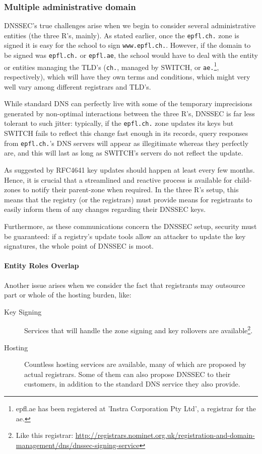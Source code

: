 \documentclass[a4paper,twocolumn]{scrartcl}
\begin{document}
\subsubsection{Multiple administrative domain}
DNSSEC's true challenges arise when we begin to consider several administrative entities (the three R's, mainly). As stated earlier, once the \verb|epfl.ch.| zone is signed it is easy for the school to sign \verb|www.epfl.ch.|. However, if the domain to be signed was \verb|epfl.ch.| or \verb|epfl.ae|, the school would have to deal with the entity or entities managing the TLD's (\verb|ch.|, managed by SWITCH, or \verb|ae.|\footnote{epfl.ae has been registered at 'Instra Corporation Pty Ltd', a registrar for the ae.}, respectively), which will have they own terms and conditions, which might very well vary among different registrars and TLD's. 	

While standard DNS can perfectly live with some of the temporary imprecisions generated by non-optimal interactions between the three R's, DNSSEC is far less tolerant to such jitter: typically, if the \verb|epfl.ch.| zone updates its keys but SWITCH fails to reflect this change fast enough in its records, query responses from \verb|epfl.ch.|'s DNS servers will appear as illegitimate whereas they perfectly are, and this will last as long as SWITCH's servers do not reflect the update.

As suggested by RFC4641 \cite{RFC4641} key updates should  happen at least every few months. Hence, it is crucial that a streamlined and reactive process is available for child-zones to notify their parent-zone when required. In the three R's setup, this means that the registry (or the registrars) must provide means for registrants to easily inform them of any changes regarding their DNSSEC keys.


Furthermore, as these communications concern the DNSSEC setup, security must be guaranteed: if a registry's update tools allow an attacker to update the key signatures, the whole point of DNSSEC is moot.

\paragraph*{Entity Roles Overlap} Another issue arises when we consider the fact that registrants may outsource part or whole of the hosting burden, like:

\begin{description}
\item[Key Signing] Services that will handle the zone signing and key rollovers are available\footnote{Like this registrar: \url{http://registrars.nominet.org.uk/registration-and-domain-management/dns/dnssec-signing-service}}.
\item[Hosting] Countless hosting services are available, many of which are proposed by actual registrars. Some of them can also propose DNSSEC to their customers, in addition to the standard DNS service they also provide.
\end{description}
\end{document}

